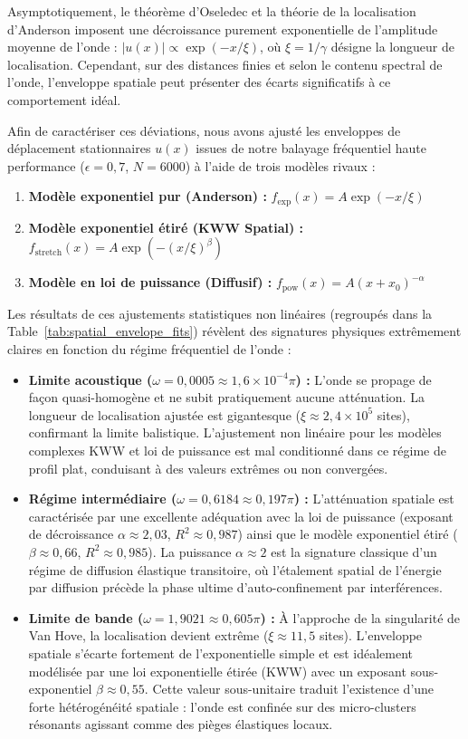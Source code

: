 Asymptotiquement, le théorème d'Oseledec et la théorie de la localisation d'Anderson imposent une décroissance purement exponentielle de l'amplitude moyenne de l'onde : $|u(x)| \propto \exp(-x/\xi)$, où $\xi = 1/\gamma$ désigne la longueur de localisation. Cependant, sur des distances finies et selon le contenu spectral de l'onde, l'enveloppe spatiale peut présenter des écarts significatifs à ce comportement idéal. 

Afin de caractériser ces déviations, nous avons ajusté les enveloppes de déplacement stationnaires $u(x)$ issues de notre balayage fréquentiel haute performance ($\epsilon = 0{,}7$, $N = 6000$) à l'aide de trois modèles rivaux :
\begin{enumerate}
    \item \textbf{Modèle exponentiel pur (Anderson) :} $f_{\exp}(x) = A \exp(-x/\xi)$
    \item \textbf{Modèle exponentiel étiré (KWW Spatial) :} $f_{\text{stretch}}(x) = A \exp(-(x/\xi)^\beta)$
    \item \textbf{Modèle en loi de puissance (Diffusif) :} $f_{\text{pow}}(x) = A (x + x_0)^{-\alpha}$
\end{enumerate}

Les résultats de ces ajustements statistiques non linéaires (regroupés dans la Table~\ref{tab:spatial_envelope_fits}) révèlent des signatures physiques extrêmement claires en fonction du régime fréquentiel de l'onde :
\begin{itemize}
    \item \textbf{Limite acoustique ($\omega = 0{,}0005 \approx 1{,}6 \times 10^{-4}\pi$) :} L'onde se propage de façon quasi-homogène et ne subit pratiquement aucune atténuation. La longueur de localisation ajustée est gigantesque ($\xi \approx 2{,}4 \times 10^5$ sites), confirmant la limite balistique. L'ajustement non linéaire pour les modèles complexes KWW et loi de puissance est mal conditionné dans ce régime de profil plat, conduisant à des valeurs extrêmes ou non convergées.
    \item \textbf{Régime intermédiaire ($\omega = 0{,}6184 \approx 0{,}197\pi$) :} L'atténuation spatiale est caractérisée par une excellente adéquation avec la loi de puissance (exposant de décroissance $\alpha \approx 2{,}03$, $R^2 \approx 0{,}987$) ainsi que le modèle exponentiel étiré ($\beta \approx 0{,}66$, $R^2 \approx 0{,}985$). La puissance $\alpha \approx 2$ est la signature classique d'un régime de diffusion élastique transitoire, où l'étalement spatial de l'énergie par diffusion précède la phase ultime d'auto-confinement par interférences.
    \item \textbf{Limite de bande ($\omega = 1{,}9021 \approx 0{,}605\pi$) :} À l'approche de la singularité de Van Hove, la localisation devient extrême ($\xi \approx 11{,}5$ sites). L'enveloppe spatiale s'écarte fortement de l'exponentielle simple et est idéalement modélisée par une loi exponentielle étirée (KWW) avec un exposant sous-exponentiel $\beta \approx 0{,}55$. Cette valeur sous-unitaire traduit l'existence d'une forte hétérogénéité spatiale : l'onde est confinée sur des micro-clusters résonants agissant comme des pièges élastiques locaux.
\end{itemize}

